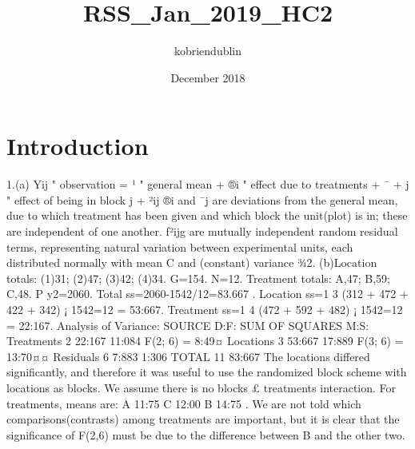 \documentclass{article}
\title{RSS_Jan_2019_HC2}
\author{kobriendublin }
\date{December 2018}
\begin{document}
\maketitle

\section{Introduction}
1.(a) Yij
"
observation
= ¹
"
general mean
+ ®i
"
effect
due to
treatments
+ ¯ + j
"
effect of
being in
block j
+ ²ij
®i and ¯j are deviations from the general mean, due to which treatment has been given and
which block the unit(plot) is in; these are independent of one another.
f²ijg are mutually independent random residual terms, representing natural variation between
experimental units, each distributed normally with mean C and (constant) variance ¾2.
(b)Location totals: (1)31; (2)47; (3)42; (4)34. G=154. N=12.
Treatment totals: A,47; B,59; C,48.
P
y2=2060.
Total ss=2060-1542/12=83.667 .
Location ss=1
3 (312 + 472 + 422 + 342) ¡ 1542=12 = 53:667.
Treatment ss=1
4 (472 + 592 + 482) ¡ 1542=12 = 22:167.
Analysis of Variance:
SOURCE D:F: SUM OF SQUARES M:S:
Treatments 2 22:167 11:084 F(2; 6) = 8:49¤
Locations 3 53:667 17:889 F(3; 6) = 13:70¤¤
Residuals 6 7:883 1:306
TOTAL 11 83:667
The locations differed significantly, and therefore it was useful to use the randomized block scheme
with locations as blocks. We assume there is no blocks £ treatments interaction.
For treatments, means are: A 11:75
C 12:00
B 14:75
. We are not told which comparisons(contrasts) among
treatments are important, but it is clear that the significance of F(2,6) must be due to the difference
between B and the other two.
\end{document}
